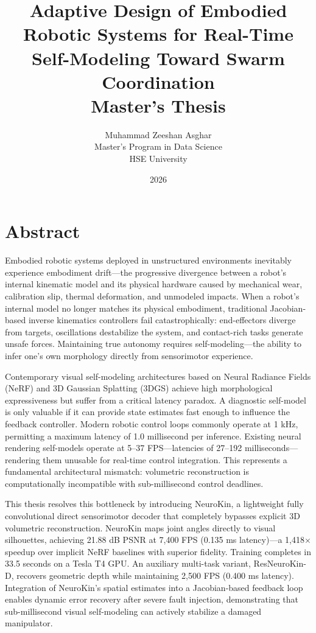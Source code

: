 \documentclass[12pt,a4paper,oneside]{report}
\title{
    \vspace{2cm}
    \textbf{\Large Adaptive Design of Embodied Robotic Systems for Real-Time Self-Modeling Toward Swarm Coordination} \\
    \vspace{1cm}
    \large Master's Thesis
}
\author{
    Muhammad Zeeshan Asghar \\
    Master's Program in Data Science \\
    HSE University
}
\date{\vspace{1cm} 2026}
\begin{document}
\maketitle
\clearpage

\chapter*{Abstract}

Embodied robotic systems deployed in unstructured environments inevitably experience embodiment drift---the progressive divergence between a robot's internal kinematic model and its physical hardware caused by mechanical wear, calibration slip, thermal deformation, and unmodeled impacts. When a robot's internal model no longer matches its physical embodiment, traditional Jacobian-based inverse kinematics controllers fail catastrophically: end-effectors diverge from targets, oscillations destabilize the system, and contact-rich tasks generate unsafe forces. Maintaining true autonomy requires self-modeling---the ability to infer one's own morphology directly from sensorimotor experience.

Contemporary visual self-modeling architectures based on Neural Radiance Fields (NeRF) and 3D Gaussian Splatting (3DGS) achieve high morphological expressiveness but suffer from a critical latency paradox. A diagnostic self-model is only valuable if it can provide state estimates fast enough to influence the feedback controller. Modern robotic control loops commonly operate at 1 kHz, permitting a maximum latency of 1.0 millisecond per inference. Existing neural rendering self-models operate at 5--37 FPS---latencies of 27--192 milliseconds---rendering them unusable for real-time control integration. This represents a fundamental architectural mismatch: volumetric reconstruction is computationally incompatible with sub-millisecond control deadlines.

This thesis resolves this bottleneck by introducing NeuroKin, a lightweight fully convolutional direct sensorimotor decoder that completely bypasses explicit 3D volumetric reconstruction. NeuroKin maps joint angles directly to visual silhouettes, achieving 21.88 dB PSNR at 7,400 FPS (0.135 ms latency)---a 1,418$\times$ speedup over implicit NeRF baselines with superior fidelity. Training completes in 33.5 seconds on a Tesla T4 GPU. An auxiliary multi-task variant, ResNeuroKin-D, recovers geometric depth while maintaining 2,500 FPS (0.400 ms latency). Integration of NeuroKin's spatial estimates into a Jacobian-based feedback loop enables dynamic error recovery after severe fault injection, demonstrating that sub-millisecond visual self-modeling can actively stabilize a damaged manipulator.
\end{document}
